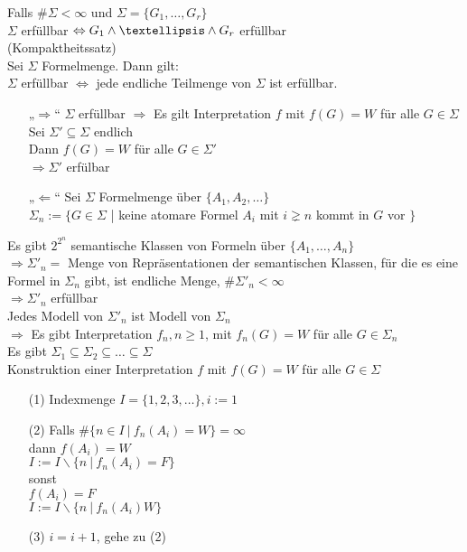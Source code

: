 Falls $\# \Sigma < \infty$ und $\Sigma = \{ G_1, …, G_r\}$\\
$\Sigma$ erfüllbar $\Leftrightarrow G_1 \AND … \AND G_r$ erfüllbar\\

 (Kompaktheitssatz)\\
Sei $\Sigma$ Formelmenge. Dann gilt:\\
$\Sigma$ erfüllbar $\Leftrightarrow$ jede endliche Teilmenge von $\Sigma$ ist erfüllbar.

\beweis{}
\begin{itemize}
\item[„$\Rightarrow$“] $\Sigma$ erfüllbar $\Rightarrow$ Es gilt Interpretation $f$ mit $f(G) =W$ für alle $G \in \Sigma$\\

Sei $\Sigma' \subseteq \Sigma$ endlich\\
Dann $f(G) = W$ für alle $G \in \Sigma'$\\
$\Rightarrow \Sigma'$ erfülbar

\item[„$\Leftarrow$“] Sei $\Sigma$ Formelmenge über $\{A_1, A_2, … \}$\\
$\Sigma_n := \{ G \in \Sigma$ | keine atomare Formel $A_i$ mit $i \gneq n$ kommt in $G$ vor $\}$

\end{itemize}

Es gibt $2^{2^n}$ semantische Klassen von Formeln über $\{A_1, …, A_n\}$\\
$\Rightarrow \Sigma'_n =$ Menge von Repräsentationen der semantischen Klassen, für die es eine Formel in $\Sigma_n$ gibt, ist endliche Menge, $\# \Sigma'_n < \infty$\\
$\Rightarrow \Sigma'_n$ erfüllbar\\

Jedes Modell von $\Sigma'_n$ ist Modell von $\Sigma_n$\\
$\Rightarrow$ Es gibt Interpretation $f_n, n \geq 1$, mit $f_n(G) = W$ für alle $G \in \Sigma_n$\\
Es gibt $\Sigma_1 \subseteq \Sigma_2 \subseteq … \subseteq \Sigma$\\
Konstruktion einer Interpretation $f$ mit $f(G)=W$ für alle $G \in \Sigma$
\begin{enumerate}
\item[(1)] Indexmenge $I = \{ 1, 2, 3, …\}, i:=1$
\item[(2)] Falls $\# \{ n \in I\ |\ f_n(A_i) = W \} = \infty$\\
dann $f(A_i) = W$\\
$I := I \backslash \{ n\ |\ f_n(A_i)=F \}$\\
sonst\\
$f(A_i) = F$\\
$I := I \backslash \{ n\ |\ f_n(A_i)  W\}$
\item[(3)] $i=i+1$, gehe zu (2)
\end{enumerate}